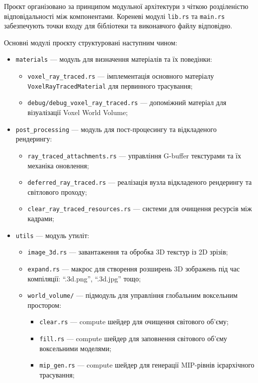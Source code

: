Проєкт організовано за принципом модульної архітектури з чіткою розділеністю відповідальності між компонентами. Кореневі модулі \texttt{lib.rs} та \texttt{main.rs} забезпечують точки входу для бібліотеки та виконавчого файлу відповідно.

Основні модулі проєкту структуровані наступним чином:

\begin{itemize}[itemsep=0pt, topsep=0pt, label=$\diamond$]
    \item \texttt{materials} --- модуль для визначення матеріалів та їх поведінки:
    \begin{itemize}
        \item \texttt{voxel\_ray\_traced.rs} --- імплементація основного матеріалу\\ \texttt{VoxelRayTracedMaterial} для первинного трасування;
        \item \texttt{debug/debug\_voxel\_ray\_traced.rs} --- допоміжний матеріал для візуалізації Voxel World Volume;
    \end{itemize}
    \item \texttt{post\_processing} --- модуль для пост-процесингу та відкладеного рендерингу:
    \begin{itemize}
        \item \texttt{ray\_traced\_attachments.rs} --- управління G-buffer текстурами та їх механіка оновлення;
        \item \texttt{deferred\_ray\_traced.rs} --- реалізація вузла відкладеного рендерингу та світлового проходу;
        \item \texttt{clear\_ray\_traced\_resources.rs} --- системи для очищення ресурсів між кадрами;
    \end{itemize}
    \item \texttt{utils} --- модуль утиліт:
    \begin{itemize}
        \item \texttt{image\_3d.rs} --- завантаження та обробка 3D текстур із 2D зрізів;
        \item \texttt{expand.rs} --- макрос для створення розширень 3D зображень під час компіляції: ``.3d.png'', ``.3d.jpg'' тощо;
        \item \texttt{world\_volume/} --- підмодуль для управління глобальним воксельним простором:
        \begin{itemize}
            \item \texttt{clear.rs} --- compute шейдер для очищення світового об'єму;
            \item \texttt{fill.rs} --- compute шейдер для заповнення світового об'єму воксельними моделями;
            \item \texttt{mip\_gen.rs} --- compute шейдер для генерації MIP-рівнів ієрархічного трасування;
        \end{itemize}
    \end{itemize}
\end{itemize}

